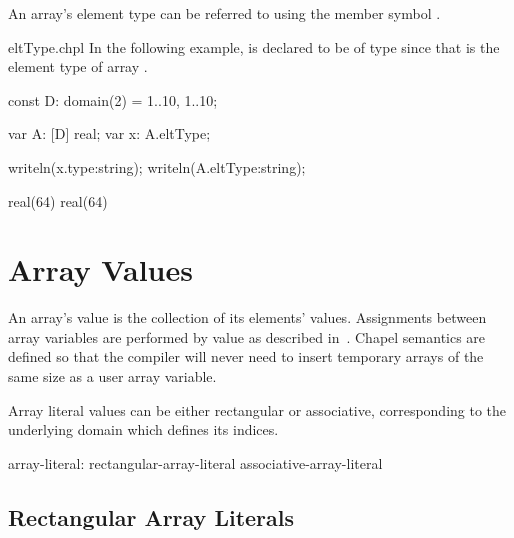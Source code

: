 %
%
An array's element type can be referred to using the member symbol
.

\begin{chapelexample}{eltType.chpl}
In the following example,  is declared to be of type
 since that is the element type of array .
\begin{chapelpre}
const D: domain(2) = {1..10, 1..10};
\end{chapelpre}
\begin{chapel}
var A: [D] real;
var x: A.eltType;
\end{chapel}
\begin{chapelpost}
writeln(x.type:string);
writeln(A.eltType:string);
\end{chapelpost}
\begin{chapeloutput}
real(64)
real(64)
\end{chapeloutput}
\end{chapelexample}

\section{Array Values}
\label{Array_Values}

An array's value is the collection of its elements' values.
Assignments between array variables are performed by value as
described in~.  Chapel semantics are defined so
that the compiler will never need to insert temporary arrays of the
same size as a user array variable.


Array literal values can be either rectangular or associative, corresponding to
the underlying domain which defines its indices. 

\begin{syntax}
array-literal:
  rectangular-array-literal
  associative-array-literal
\end{syntax}

\subsection{Rectangular Array Literals}
\label{Rectangular_Array_Literals}

